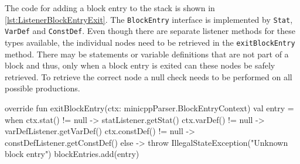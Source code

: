 The code for adding a block entry to the stack is shown in \ref{lst:ListenerBlockEntryExit}. The \verb|BlockEntry| interface is implemented by \verb|Stat|, \verb|VarDef| and \verb|ConstDef|. Even though there are separate listener methods for these types available, the individual nodes need to be retrieved in the \verb|exitBlockEntry| method. There may be statements or variable definitions that are not part of a block and thus, only when a block entry is exited can these nodes be safely retrieved. To retrieve the correct node a null check needs to be performed on all possible productions. 


\begin{KotlinCode}[float,numbers=none,caption=Implementation of the \texttt{exitBlockEntry} method., label=lst:ListenerBlockEntryExit]
    override fun exitBlockEntry(ctx: minicppParser.BlockEntryContext) {
        val entry = when {
            ctx.stat() != null -> statListener.getStat()
            ctx.varDef() != null -> varDefListener.getVarDef()
            ctx.constDef() != null -> constDefListener.getConstDef()
            else -> throw IllegalStateException("Unknown block entry")
        }
        blockEntries.add(entry)
    }
\end{KotlinCode}
